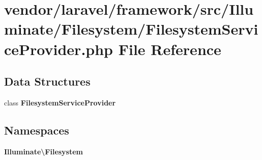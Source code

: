 \section{vendor/laravel/framework/src/\+Illuminate/\+Filesystem/\+Filesystem\+Service\+Provider.php File Reference}
\label{_filesystem_service_provider_8php}
\subsection*{Data Structures}
\begin{DoxyCompactItemize}
\item 
class {\bf Filesystem\+Service\+Provider}
\end{DoxyCompactItemize}
\subsection*{Namespaces}
\begin{DoxyCompactItemize}
\item 
 {\bf Illuminate\textbackslash{}\+Filesystem}
\end{DoxyCompactItemize}
